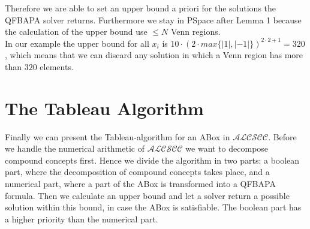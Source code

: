 \documentclass{book}
\theoremstyle{break}
\theoremstyle{definition}
\begin{document}
Therefore we are able to set an upper bound a priori for the solutions the QFBAPA solver returns. Furthermore we stay in PSpace after Lemma 1 because the calculation of the upper bound use $\leq N$ Venn regions.\\
In our example the upper bound for all $x_i$ is $10\cdot (2\cdot max\{|1|,|-1|\})^{2\cdot 2+1}=320$, which means that we can discard any solution in which a Venn region has more than $320$ elements.
\section{The Tableau Algorithm}\label{Tableau}
Finally we can present the Tableau-algorithm for an ABox in $\mathcal{ALCSCC}$. Before we handle the numerical arithmetic of $\mathcal{ALCSCC}$ we want to decompose compound concepts first. Hence we divide the algorithm in two parts: a boolean part, where the decomposition of compound concepts takes place, and a numerical part, where a part of the ABox is transformed into a QFBAPA formula. Then we calculate an upper bound and let a solver return a possible solution within this bound, in case the ABox is satisfiable. The boolean part has a higher priority than the numerical part. 
\end{document}
